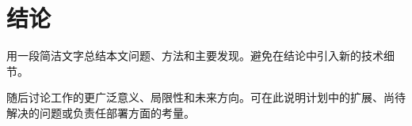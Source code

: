 \section{结论}

用一段简洁文字总结本文问题、方法和主要发现。避免在结论中引入新的技术细节。

随后讨论工作的更广泛意义、局限性和未来方向。可在此说明计划中的扩展、尚待解决的问题或负责任部署方面的考量。

\newpage
